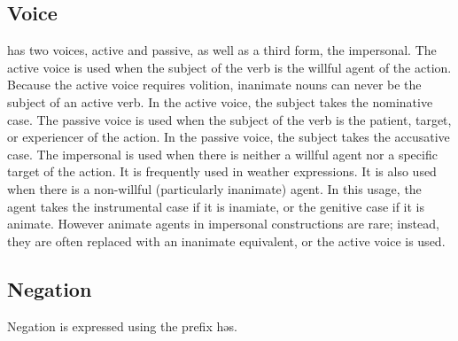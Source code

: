 \subsection{Voice}
\Langname{} has two voices, active and passive, as well as a third form, the
impersonal.
The active voice is used when the subject of the verb is the willful agent of
the action.
Because the active voice requires volition, inanimate nouns can never be the
subject of an active verb.
In the active voice, the subject takes the nominative case.
The passive voice is used when the subject of the verb is the patient, target,
or experiencer of the action.
In the passive voice, the subject takes the accusative case.
The impersonal is used when there is neither a willful agent nor a specific
target of the action.
It is frequently used in weather expressions.
It is also used when there is a non-willful (particularly inanimate) agent.
In this usage, the agent takes the instrumental case if it is inamiate, or the
genitive case if it is animate.
However animate agents in impersonal constructions are rare; instead, they are
often replaced with an inanimate equivalent, or the active voice is used.

\subsection{Negation}
Negation is expressed using the prefix {\ll həs}.

